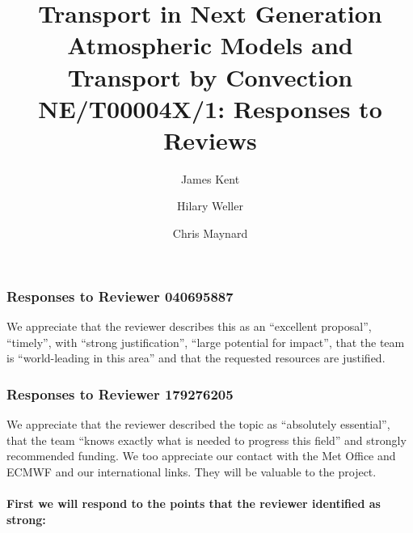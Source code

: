 

\title{Transport in Next Generation Atmospheric Models and Transport by Convection\\
NE/T00004X/1: Responses to Reviews
}
\author
{
    James Kent \and Hilary Weller \and Chris Maynard
}
\date{}
\maketitle

\subsubsection*{Responses to Reviewer 040695887}

We appreciate that the reviewer describes this as an ``excellent proposal'', ``timely'', with ``strong justification'', ``large potential for impact'', that the team is ``world-leading in this area'' and that the requested resources are justified.

\subsubsection*{Responses to Reviewer 179276205}

We appreciate that the reviewer described the topic as ``absolutely essential'', that the team ``knows exactly what is needed to progress this field'' and strongly recommended funding. We too appreciate our contact with the Met Office and ECMWF and our international links. They will be valuable to the project. 

\paragraph*{First we will respond to the points that the reviewer identified as strong:}

